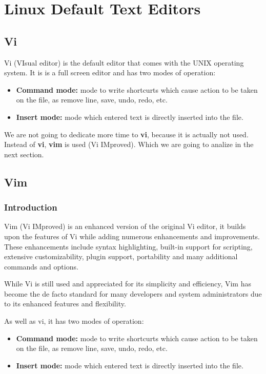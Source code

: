 \documentclass{article}
\begin{document}
\newpage
\section{Linux Default Text Editors}
\subsection{Vi}
Vi (VIsual editor) is the default editor that comes with the UNIX operating system. It is is a full screen editor and has two modes of operation:

\begin{itemize}
    \item \textbf{Command mode:} mode to write shortcurts which cause action to be taken on the file, as remove line, save, undo, redo, etc.
    \item \textbf{Insert mode:} mode which entered text is directly inserted into the file.
\end{itemize}

We are not going to dedicate more time to \textbf{vi}, because it is actually not used. Instead of \textbf{vi}, \textbf{vim} is used (Vi IMproved). Which we are going to analize in the next section.

\subsection{Vim}

\subsubsection{Introduction}

Vim (Vi IMproved) is an enhanced version of the original Vi editor, it builds upon the features of Vi while adding numerous enhancements and improvements. These enhancements include syntax highlighting, built-in support for scripting, extensive customizability, plugin support, portability and many additional commands and options.

While Vi is still used and appreciated for its simplicity and efficiency, Vim has become the de facto standard for many developers and system administrators due to its enhanced features and flexibility.

As well as vi, it has two modes of operation:

\begin{itemize}
    \item \textbf{Command mode:} mode to write shortcurts which cause action to be taken on the file, as remove line, save, undo, redo, etc.
    \item \textbf{Insert mode:} mode which entered text is directly inserted into the file.
\end{itemize}
\end{document}
